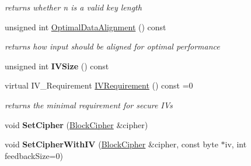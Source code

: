 \begin{DoxyCompactItemize}
\begin{DoxyCompactList}\small\item\em returns whether n is a valid key length \item\end{DoxyCompactList}\item 
\hypertarget{class_cipher_mode_base_a620b247030548f559a9b426e47234f12}{
unsigned int \hyperlink{class_cipher_mode_base_a620b247030548f559a9b426e47234f12}{OptimalDataAlignment} () const }
\label{class_cipher_mode_base_a620b247030548f559a9b426e47234f12}

\begin{DoxyCompactList}\small\item\em returns how input should be aligned for optimal performance \item\end{DoxyCompactList}\item 
\hypertarget{class_cipher_mode_base_a353498711671d0f44a87fc27211c3d1c}{
unsigned int {\bfseries IVSize} () const }
\label{class_cipher_mode_base_a353498711671d0f44a87fc27211c3d1c}

\item 
\hypertarget{class_cipher_mode_base_aa79d2b3623c869ee47d00a94ca9c6dc5}{
virtual IV\_\-Requirement \hyperlink{class_cipher_mode_base_aa79d2b3623c869ee47d00a94ca9c6dc5}{IVRequirement} () const =0}
\label{class_cipher_mode_base_aa79d2b3623c869ee47d00a94ca9c6dc5}

\begin{DoxyCompactList}\small\item\em returns the minimal requirement for secure IVs \item\end{DoxyCompactList}\item 
\hypertarget{class_cipher_mode_base_a9bccbd9e2c1a76282ddb6f1a79b3d80e}{
void {\bfseries SetCipher} (\hyperlink{class_block_cipher}{BlockCipher} \&cipher)}
\label{class_cipher_mode_base_a9bccbd9e2c1a76282ddb6f1a79b3d80e}

\item 
\hypertarget{class_cipher_mode_base_a6bc4f26f7c59f484073d04829274875a}{
void {\bfseries SetCipherWithIV} (\hyperlink{class_block_cipher}{BlockCipher} \&cipher, const byte $\ast$iv, int feedbackSize=0)}
\label{class_cipher_mode_base_a6bc4f26f7c59f484073d04829274875a}

\end{DoxyCompactItemize}
